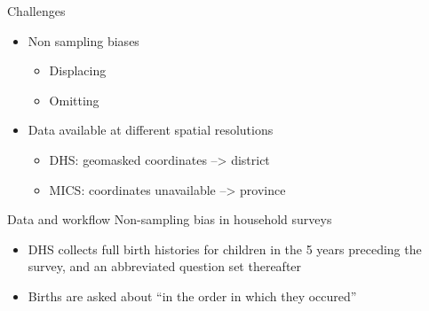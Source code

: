 \documentclass[ignorenonframetext,]{beamer}
\providecommand{\tightlist}{%
  \setlength{\itemsep}{0pt}\setlength{\parskip}{0pt}}
\begin{document}
\begin{frame}[t]{Challenges}
\protect\hypertarget{challenges}{}

\begin{itemize}
\tightlist
\item
  Non sampling biases

  \begin{itemize}
  \tightlist
  \item
    Displacing
  \item
    Omitting
  \end{itemize}
\item
  Data available at different spatial resolutions

  \begin{itemize}
  \tightlist
  \item
    DHS: geomasked coordinates --\textgreater{} district
  \item
    MICS: coordinates unavailable --\textgreater{} province
  \end{itemize}
\end{itemize}

\end{frame}

\begin{frame}[t]{Data and workflow \textbar{} Non-sampling bias in
household surveys}
\protect\hypertarget{data-and-workflow-non-sampling-bias-in-household-surveys}{}

\begin{itemize}
\tightlist
\item
  DHS collects full birth histories for children in the 5 years
  preceding the survey, and an abbreviated question set thereafter
\item
  Births are asked about ``in the order in which they occured''
\end{itemize}

\end{frame}
\end{document}
